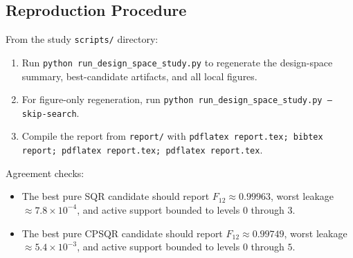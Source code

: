 ﻿\documentclass[aps,pra,twocolumn,reprint,amsmath,amssymb,floatfix]{revtex4-2}
\begin{document}
\subsection{Reproduction Procedure}

From the study \texttt{scripts/} directory:
\begin{enumerate}
  \item Run \texttt{python run\_design\_space\_study.py} to regenerate the
  design-space summary, best-candidate artifacts, and all local figures.
  \item For figure-only regeneration, run
  \texttt{python run\_design\_space\_study.py --skip-search}.
  \item Compile the report from \texttt{report/} with
  \texttt{pdflatex report.tex; bibtex report; pdflatex report.tex; pdflatex report.tex}.
\end{enumerate}

Agreement checks:
\begin{itemize}
  \item The best pure SQR candidate should report
  $F_{12} \approx 0.99963$, worst leakage
  $\approx 7.8\times10^{-4}$, and active support bounded to levels $0$ through
  $3$.
  \item The best pure CPSQR candidate should report
  $F_{12} \approx 0.99749$, worst leakage
  $\approx 5.4\times10^{-3}$, and active support bounded to levels $0$ through
  $5$.
\end{itemize}
\end{document}
